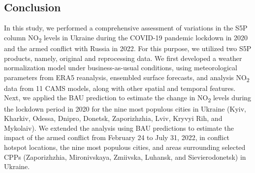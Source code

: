 \subsection{Conclusion} \label{chap3_conclusion}
In this study, we performed a comprehensive assessment of variations in the S5P column NO\textsubscript{2} levels in Ukraine during the COVID-19 pandemic lockdown in 2020 and the armed conflict with Russia in 2022. For this purpose, we utilized two S5P products, namely, original and reprocessing data. We first developed a weather normalization model under business-as-usual conditions, using meteorological parameters from ERA5 reanalysis, ensembled surface forecasts, and analysis NO\textsubscript{2} data from 11 CAMS models, along with other spatial and temporal features. Next, we applied the BAU prediction to estimate the change in NO\textsubscript{2} levels during the lockdown period in 2020 for the nine most populous cities in Ukraine (Kyiv, Kharkiv, Odessa, Dnipro, Donetsk, Zaporizhzhia, Lviv, Kryvyi Rih, and Mykolaiv). We extended the analysis using BAU predictions to estimate the impact of the armed conflict from February 24 to July 31, 2022, in conflict hotspot locations, the nine most populous cities, and areas surrounding selected CPPs (Zaporizhzhia, Mironivskaya, Zmiivska, Luhansk, and Sievierodonetsk) in Ukraine.\par

